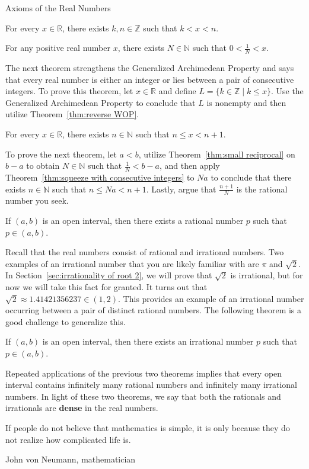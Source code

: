 \begin{section}{Axioms of the Real Numbers}
\begin{theorem}
For every $x\in\mathbb{R}$, there exists $k,n\in\mathbb{Z}$ such that $k<x<n$.
\end{theorem}

\begin{theorem}\label{thm:small reciprocal}
For any positive real number $x$, there exists $N\in \mathbb{N}$ such that $0<\frac{1}{N}<x$.
\end{theorem}

The next theorem strengthens the Generalized Archimedean Property and says that every real number is either an integer or lies between a pair of consecutive integers. To prove this theorem, let $x\in\mathbb{R}$ and define $L=\{k\in\mathbb{Z}\mid k\leq x\}$. Use the Generalized Archimedean Property to conclude that $L$ is nonempty and then utilize Theorem~\ref{thm:reverse WOP}.

\begin{theorem}\label{thm:squeeze with consecutive integers}
For every $x\in\mathbb{R}$, there exists $n\in \mathbb{N}$ such that $n\leq x<n+1$.
\end{theorem}

To prove the next theorem, let $a<b$, utilize Theorem~\ref{thm:small reciprocal} on $b-a$ to obtain $N\in\mathbb{N}$ such that $\frac{1}{N}<b-a$, and then apply Theorem~\ref{thm:squeeze with consecutive integers} to $Na$ to conclude that there exists $n\in\mathbb{N}$ such that $n\leq Na<n+1$. Lastly, argue that $\frac{n+1}{N}$ is the rational number you seek.

\begin{theorem}\label{thm:rationals dense}
If $(a,b)$ is an open interval, then there exists a rational number $p$ such that $p\in(a,b)$.
\end{theorem}

Recall that the real numbers consist of rational and irrational numbers.  Two examples of an irrational number that you are likely familiar with are $\pi$ and  $\sqrt{2}$. In Section~\ref{sec:irrationality of root 2}, we will prove that $\sqrt{2}$ is irrational, but for now we will take this fact for granted. It turns out that $\sqrt{2}\approx 1.41421356237\in (1,2)$. This provides an example of an irrational number occurring between a pair of distinct rational numbers. The following theorem is a good challenge to generalize this.

\begin{theorem}\label{thm:irrationals dense}
If $(a,b)$ is an open interval, then there exists an irrational number $p$ such that $p\in(a,b)$.
\end{theorem}

Repeated applications of the previous two theorems implies that every open interval contains infinitely many rational numbers and infinitely many irrational numbers. In light of these two theorems, we say that both the rationals and irrationals are \textbf{dense} in the real numbers. 

\epigraph{If people do not believe that mathematics is simple, it is only because they do not realize how complicated life is.}{John von Neumann, mathematician}
\end{section}